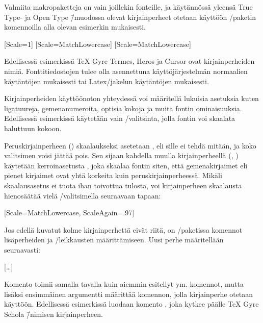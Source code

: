 Valmiita makropaketteja on vain joillekin fonteille, ja käytännössä
yleensä True Type- ja Open Type \=/muodossa olevat kirjainperheet
otetaan käyttöön \-/paketin komennoilla alla olevan
esimerkin mukaisesti.

\begin{koodilohkosis}
  \setmainfont{TeX Gyre Termes}[Scale=1]
  \setsansfont{TeX Gyre Heros} [Scale=MatchLowercase]
  \setmonofont{TeX Gyre Cursor}[Scale=MatchLowercase]
\end{koodilohkosis}

Edellisessä esimerkissä TeX Gyre Termes, Heros ja Cursor ovat
kirjainperheiden nimiä. Fonttitiedostojen tulee olla asennettuna
käyttöjärjestelmän normaalien käytäntöjen mukaisesti tai Latex\-/jakelun
käytäntöjen mukaisesti.

Kirjainperheiden käyttöönoton yhteydessä voi määritellä lukuisia
asetuksia kuten ligatuureja, gemenanumeroita, optisia kokoja ja muita
fontin ominaisuuksia. Edellisessä esimerkissä käytetään vain
\-/valitsinta, jolla fontin voi skaalata haluttuun kokoon.

Peruskirjainperheen () skaalaukseksi asetetaan
, eli sille ei tehdä mitään, ja koko valitsimen voisi
jättää pois. Sen sijaan kahdella muulla kirjainperheellä (, ) käytetään
ker\-roin\-ase\-tus\-ta , joka skaalaa fontin
siten, että gemenakirjaimet eli pienet kirjaimet ovat yhtä korkeita kuin
peruskirjainperheessä. Mikäli skaa\-laus\-ase\-tus
 ei tuota ihan toivottua tulosta, voi
kirjainperheen skaalausta hienosäätää vielä
\-/valitsimella seuraavaan tapaan:

\begin{koodilohkosis}
  \setmonofont{TeX Gyre Cursor}
  [Scale=MatchLowercase, ScaleAgain=.97]
\end{koodilohkosis}

\pagebreak[3]

Jos edellä kuvatut kolme kirjainperhettä eivät riitä, on
\-/paketissa komennot lisäperheiden ja \=/leikkausten
määrittämiseen. Uusi perhe määritellään seuraavasti:

\begin{koodilohkosis}
  […]
\end{koodilohkosis}

Komento  toimii samalla tavalla kuin aiemmin
esitellyt  ym. komennot, mutta lisäksi
ensimmäinen argumentti määrittää komennon, jolla kirjainperhe otetaan
käyttöön. Edellisessä esimerkissä luodaan komento , joka kytkee päälle TeX Gyre Scho\-la \=/nimisen
kirjainperheen.

